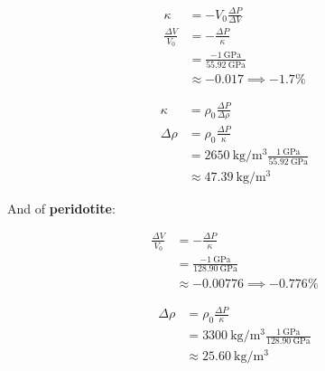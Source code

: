 \documentclass{template}
\begin{document}
\begin{enumerate}[label=\textbf{\arabic*.}]
\begin{enumerate}[label=\Alph*)]
{    \noindent
    \begin{minipage}[t]{0.48\textwidth}
        \begin{align*}
            \kappa &= -V_0 \frac{\Delta P}{\Delta V} \\
            \frac{\Delta V}{V_0} &= -\frac{\Delta P}{\kappa} \\
            &= \frac{-\qty{1}{\GPa}}{\qty{55.92}{\GPa}}\\
            &\approx \boxed{-0.017 \implies -1.7\%}
        \end{align*}
    \end{minipage}%
    \hfill
    \begin{minipage}[t]{0.48\textwidth}
        \begin{align*}
            \kappa &= \rho_0 \frac{\Delta P}{\Delta \rho} \\
            \Delta \rho &= \rho_0 \frac{\Delta P}{\kappa} \\
            &= \qty{2650}{\kg\per\m\cubed} \frac{\qty{1}{\GPa}}{\qty{55.92}{\GPa}}\\
            &\approx \boxed{\qty{47.39}{\kg\per\m\cubed}}
        \end{align*}
    \end{minipage}

    And of \textbf{peridotite}:

    \noindent
    \begin{minipage}[t]{0.48\textwidth}
        \begin{align*}
            \frac{\Delta V}{V_0} &= -\frac{\Delta P}{\kappa} \\
            &= \frac{-\qty{1}{\GPa}}{\qty{128.90}{\GPa}}\\
            &\approx \boxed{-0.00776 \implies -0.776\%}
        \end{align*}
    \end{minipage}%
    \hfill
    \begin{minipage}[t]{0.48\textwidth}
        \begin{align*}
            \Delta \rho &= \rho_0 \frac{\Delta P}{\kappa} \\
            &= \qty{3300}{\kg\per\m\cubed} \frac{\qty{1}{\GPa}}{\qty{128.90}{\GPa}}\\
            &\approx \boxed{\qty{25.60}{\kg\per\m\cubed}}
        \end{align*}
    \end{minipage}
}


\end{enumerate}
\end{enumerate}
\end{document}
